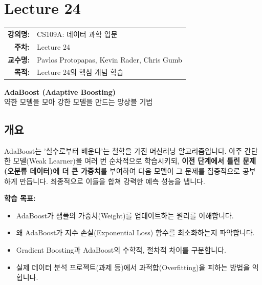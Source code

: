 \documentclass[11pt,a4paper]{book}
\makeatletter
\theoremstyle{definition}
\newcommand{\metainfo}[4]{
\begin{tcolorbox}[
    colback=lightpurple,
    colframe=darkpurple,
    boxrule=1pt,
    arc=2mm,
    left=10pt,
    right=10pt,
    top=8pt,
    bottom=8pt
]
\begin{tabular}{@{}rl@{}}
\textbf{강의명:} & #1 \\[0.3em]
\textbf{주차:} & #2 \\[0.3em]
\textbf{교수명:} & #3 \\[0.3em]
\textbf{목적:} & \begin{minipage}[t]{0.75\textwidth}#4\end{minipage}
\end{tabular}
\end{tcolorbox}
}
\makeatother
\begin{document}
\chapter{Lecture 24}
\label{ch:lecture24}

\metainfo{CS109A: 데이터 과학 입문}{Lecture 24}{Pavlos Protopapas, Kevin Rader, Chris Gumb}{Lecture 24의 핵심 개념 학습}


\begin{center}
    {\Huge \textbf{AdaBoost (Adaptive Boosting)}} \\[0.5em]
    {\Large 약한 모델을 모아 강한 모델을 만드는 앙상블 기법}
\end{center}

\vspace{1em}

\section{개요}

\begin{summarybox}[title={핵심 요약}]
AdaBoost는 '실수로부터 배운다'는 철학을 가진 머신러닝 알고리즘입니다. 아주 간단한 모델(Weak Learner)을 여러 번 순차적으로 학습시키되, \textbf{이전 단계에서 틀린 문제(오분류 데이터)에 더 큰 가중치}를 부여하여 다음 모델이 그 문제를 집중적으로 공부하게 만듭니다. 최종적으로 이들을 합쳐 강력한 예측 성능을 냅니다.
\end{summarybox}

\textbf{학습 목표:}
\begin{itemize}
    \item AdaBoost가 샘플의 가중치(Weight)를 업데이트하는 원리를 이해합니다.
    \item 왜 AdaBoost가 지수 손실(Exponential Loss) 함수를 최소화하는지 파악합니다.
    \item Gradient Boosting과 AdaBoost의 수학적, 절차적 차이를 구분합니다.
    \item 실제 데이터 분석 프로젝트(과제 등)에서 과적합(Overfitting)을 피하는 방법을 익힙니다.
\end{itemize}
\end{document}
